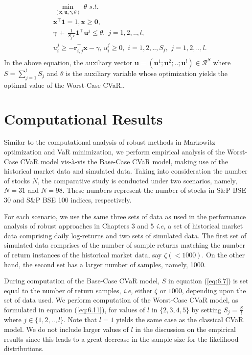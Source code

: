 \begin{equation}
\label{eq:6.11}
\begin{split}
& \min_{(\mathbf{x},\mathbf{u},\gamma,\theta)} \, \theta \, \, s.t. \\
& \mathbf{x}^{\top}\mathbf{1}=1, \mathbf{x} \geq \mathbf{0}, \\
& \gamma \, + \, \frac{1}{S_{j} \, \epsilon} \mathbf{1}^{\top}\mathbf{u}^{j} \leq \theta, \, \, j=1,2,..,l,\\
& u_{i}^{j} \geq -\mathbf{r}_{i,j}^{\top}\mathbf{x}-\gamma, \, u_{i}^{j} \geq 0, \, \, i=1,2,..,S_{j}, \, \, j=1,2,..,l. \\
\end{split}
\end{equation}
In the above equation, the auxiliary vector $\mathbf{u}=(\mathbf{u}^{1} ; \mathbf{u}^{2} ; .. ; \mathbf{u}^{l}) \in \mathcal{R}^{S}$ where $\displaystyle{S=\sum_{j=1}^{l}S_{j}}$ and $\theta$ is the auxiliary variable whose optimization yields the optimal value of the Worst-Case CVaR..

\section{Computational Results}

Similar to the computational analysis of robust methods in Markowitz optimization and VaR minimization, we perform empirical analysis of the Worst-Case CVaR  model vis-\`a-vis the Base-Case CVaR model, making use of the historical market data and simulated data. Taking into consideration the number of stocks $N$, the comparative study is conducted under two scenarios, namely, $N=31$ and $N=98$. These numbers represent the number of stocks in S\&P BSE 30 and S\&P BSE 100 indices, respectively.

For each scenario, we use the same three sets of data as used in the performance analysis of robust approaches in Chapters 3 and 5 \textit{i.e,} a set of historical market data comprising daily log-returns and two sets of simulated data. The first set of simulated data comprises of the number of sample returns matching the number of return instances of the historical market data, say $\zeta (<1000)$. On the other hand, the second set has a larger number of samples, namely, 1000.

During computation of the Base-Case CVaR model, $S$ in equation (\ref{eq:6.7}) is set equal to the number of return samples, \textit{i.e,} either $\zeta$ or $1000$, depending upon the set of data used. We perform computation of the Worst-Case CVaR model, as formulated in equation (\ref{eq:6.11}), for values of $l$ in $\{2,3,4,5\}$ by setting $\displaystyle{S_{j}=\frac{S}{l}}$ where $\displaystyle{j \in \{1,2,..,l \}}$. Note that $l=1$ yields the same case as the classical CVaR model. We do not include larger values of $l$ in the discussion on the empirical results since this leads to a great decrease in the sample size for the likelihood distributions.

